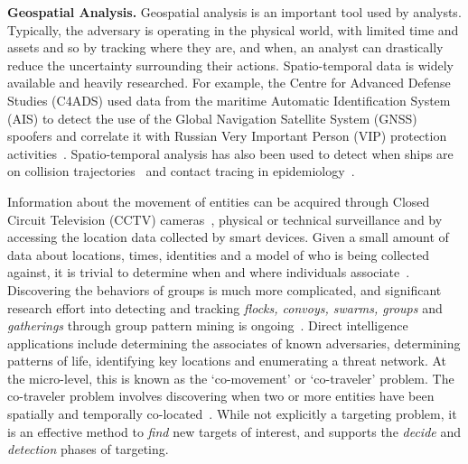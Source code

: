 \textbf{Geospatial Analysis.}
Geospatial analysis is an important tool used by analysts. 
Typically, the adversary is operating in the physical world, with limited time and assets and so by tracking where they are, and when, an analyst can drastically reduce the uncertainty surrounding their actions. 
Spatio-temporal data is widely available and heavily researched. 
For example, the Centre for Advanced Defense Studies (C4ADS) used data from the maritime Automatic Identification System (AIS) to detect the use of the Global Navigation Satellite System (GNSS) spoofers and correlate it with Russian Very Important Person (VIP) protection activities~\cite{C4ADS2019}. 
Spatio-temporal analysis has also been used to detect when ships are on collision trajectories~\cite{Tritsarolis2023} and contact tracing in epidemiology~\cite{Chao2021, Pechlivanoglou2022}.

Information about the movement of entities can be acquired through Closed Circuit Television (CCTV) cameras~\cite{Sawas2019}, physical or technical surveillance and by accessing the location data collected by smart devices.
Given a small amount of data about locations, times, identities and a model of who is being collected against, it is trivial to determine when and where individuals associate~\cite{Osullivan2022}. 
Discovering the behaviors of groups is much more complicated, and significant research effort into detecting and tracking \textit{flocks, convoys, swarms, groups} and \textit{gatherings} through group pattern mining is ongoing~\cite{Tritsarolis2021}.
Direct intelligence applications include determining the associates of known adversaries, determining patterns of life, identifying key locations and enumerating a threat network.
At the micro-level, this is known as the `co-movement' or `co-traveler' problem. 
The co-traveler problem involves discovering when two or more entities have been spatially and temporally co-located~\cite{Regli2022a}. 
While not explicitly a targeting problem, it is an effective method to \textit{find} new targets of interest, and supports the \textit{decide} and \textit{detection} phases of targeting.

